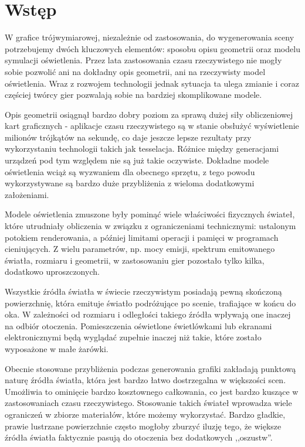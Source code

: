 \documentclass[../main.tex]{subfiles}
\begin{document}
\chapter*{Wstęp}

W grafice trójwymiarowej, niezależnie od zastosowania, do wygenerowania sceny potrzebujemy dwóch kluczowych elementów: sposobu opisu geometrii oraz modelu symulacji oświetlenia. Przez lata zastosowania czasu rzeczywistego nie mogły sobie pozwolić ani na dokładny opis geometrii, ani na rzeczywisty model oświetlenia. Wraz z rozwojem technologii jednak sytuacja ta ulega zmianie i coraz częściej twórcy gier pozwalają sobie na bardziej skomplikowane modele.

Opis geometrii osiągnął bardzo dobry poziom za sprawą dużej siły obliczeniowej kart graficznych - aplikacje czasu rzeczywistego są w stanie obsłużyć wyświetlenie milionów trójkątów na sekundę, co daje jeszcze lepsze rezultaty przy wykorzystaniu technologii takich jak tesselacja. Różnice między generacjami urządzeń pod tym względem nie są już takie oczywiste. Dokładne modele oświetlenia wciąż są wyzwaniem dla obecnego sprzętu, z tego powodu wykorzystywane są bardzo duże przybliżenia z wieloma dodatkowymi założeniami.

Modele oświetlenia zmuszone były pominąć wiele właściwości fizycznych świateł, które utrudniały obliczenia w związku z ograniczeniami technicznymi: ustalonym potokiem renderowania, a później limitami operacji i pamięci w programach cieniujących. Z wielu parametrów, np. mocy emisji, spektrum emitowanego światła, rozmiaru i geometrii, w zastosowaniu gier pozostało tylko kilka, dodatkowo uproszczonych.

Wszystkie źródła światła w świecie rzeczywistym posiadają pewną skończoną powierzchnię, która emituje światło podróżujące po scenie, trafiające w końcu do oka. W zależności od rozmiaru i odległości takiego źródła wpływają one inaczej na odbiór otoczenia. Pomieszczenia oświetlone świetlówkami lub ekranami elektronicznymi będą wyglądać zupełnie inaczej niż takie, które zostało wyposażone w małe żarówki.

Obecnie stosowane przybliżenia podczas generowania grafiki zakładają punktową naturę źródła światła, która jest bardzo łatwo dostrzegalna w większości scen. Umożliwia to ominięcie bardzo kosztownego całkowania, co jest bardzo kuszące w zastosowaniach czasu rzeczywistego. Stosowanie takich świateł wprowadza wiele ograniczeń w zbiorze materiałów, które możemy wykorzystać. Bardzo gładkie, prawie lustrzane powierzchnie często mogłoby zburzyć iluzję tego, że większe źródła światła faktycznie pasują do otoczenia bez dodatkowych ,,oszustw''.
\end{document}
